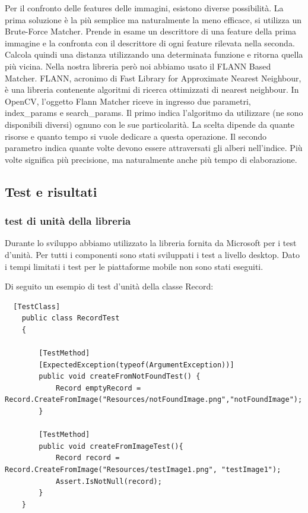 \documentclass[twoside]{supsistudent}
\begin{document}
Per il confronto delle features delle immagini, esistono diverse possibilità. La prima soluzione è la più semplice ma naturalmente la meno efficace, si utilizza un Brute-Force Matcher. Prende in esame un descrittore di una feature della prima immagine e la confronta con il descrittore di ogni feature rilevata nella seconda. Calcola quindi una distanza utilizzando una determinata funzione e ritorna quella più vicina. Nella nostra libreria però noi abbiamo usato il FLANN Based Matcher. FLANN\cite{flann}, acronimo di Fast Library for Approximate Nearest Neighbour, è una libreria contenente algoritmi di ricerca ottimizzati di nearest neighbour. In OpenCV, l'oggetto Flann Matcher riceve in ingresso due parametri, index\_params e search\_params. Il primo indica l'algoritmo da utilizzare (ne sono disponibili diversi) ognuno con le sue particolarità. La scelta dipende da quante risorse e quanto tempo si vuole dedicare a questa operazione. Il secondo parametro indica quante volte devono essere attraversati gli alberi nell'indice. Più volte significa più precisione, ma naturalmente anche più tempo di elaborazione. 

\subsection{Test e risultati}%
\subsubsection{test di unità della libreria}
Durante lo sviluppo abbiamo utilizzato la libreria fornita da Microsoft per i test d'unità. Per tutti i componenti sono stati sviluppati i test a livello desktop. Dato i tempi limitati i test per le piattaforme mobile non sono stati eseguiti. 

Di seguito un esempio di test d'unità della classe Record:

\begin{lstlisting}
  [TestClass]
    public class RecordTest
    {

        [TestMethod]
        [ExpectedException(typeof(ArgumentException))]
        public void createFromNotFoundTest() {
            Record emptyRecord = Record.CreateFromImage("Resources/notFoundImage.png","notFoundImage"); 
        }

        [TestMethod]
        public void createFromImageTest(){
            Record record = Record.CreateFromImage("Resources/testImage1.png", "testImage1");
            Assert.IsNotNull(record);
        }
    }
\end{lstlisting}
\end{document}
